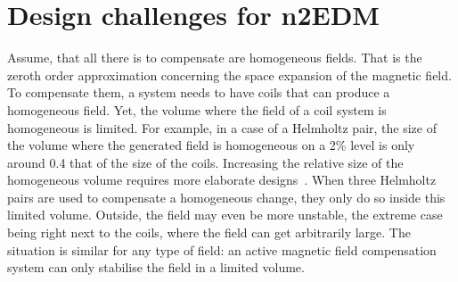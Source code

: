 



\section{Design challenges for n2EDM}
Assume, that all there is to compensate are homogeneous fields. That is the zeroth order approximation concerning the space expansion of the magnetic field. To compensate them, a system needs to have coils that can produce a homogeneous field. Yet, the volume where the field of a coil system is homogeneous is limited. For example, in a case of a Helmholtz pair, the size of the volume where the generated field is homogeneous on a 2\% level is only around 0.4 that of the size of the coils. Increasing the relative size of the homogeneous volume requires more elaborate designs~\cite{Kirschvink1992}. When three Helmholtz pairs are used to compensate a homogeneous change, they only do so inside this limited volume. Outside, the field may even be more unstable, the extreme case being right next to the coils, where the field can get arbitrarily large. The situation is similar for any type of field: an active magnetic field compensation system can only stabilise the field in a limited volume.






